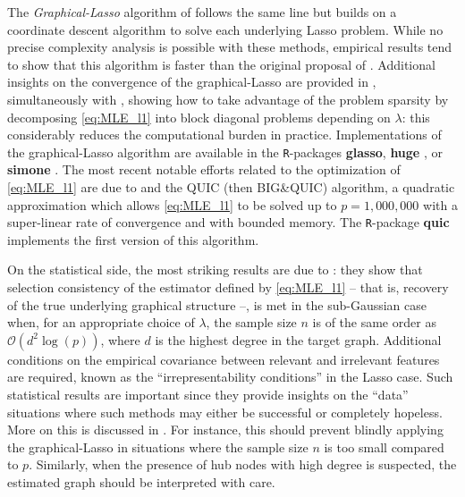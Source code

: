 The   \emph{Graphical-Lasso}   algorithm  of   \cite{2007_BS_Friedman}
follows the same line but builds  on a coordinate descent algorithm to
solve  each underlying  Lasso  problem.  While  no precise  complexity
analysis is  possible with  these methods,  empirical results  tend to
show  that this  algorithm is  faster  than the  original proposal  of
\cite{2008_JMLR_Banerjee}.  Additional insights  on the convergence of
the  graphical-Lasso  are  provided  in  \cite{mazumder2012graphical},
simultaneously   with  \cite{witten2011new},   showing  how   to  take
advantage  of the  problem sparsity  by decomposing  \eqref{eq:MLE_l1}
into block diagonal problems depending on $\lambda$: this considerably
reduces the computational burden  in practice.  Implementations of the
graphical-Lasso  algorithm are  available  in the  \texttt{R}-packages
\textbf{glasso},     \textbf{huge}    \citep{2014_huge_package},     or
\textbf{simone} \citep{2009_BI_Chiquet}. The most recent notable
efforts related  to the optimization  of \eqref{eq:MLE_l1} are  due to
\cite{hsieh2014quic,NIPS2013_4923}  and  the   QUIC  (then  BIG\&QUIC)
algorithm, a quadratic approximation which allows \eqref{eq:MLE_l1} to
be solved up to $p=1,000,000$  with a super-linear rate of convergence
and  with   bounded  memory.   The   \texttt{R}-package  \textbf{quic}
implements the first version of this algorithm.

On  the  statistical  side,  the  most striking  results  are  due  to
\cite{2011_EJS_Ravikumar}: they show that selection consistency of the
estimator defined  by \eqref{eq:MLE_l1}  -- that  is, recovery  of the
true underlying  graphical structure  --, is  met in  the sub-Gaussian
case when, for an appropriate choice of $\lambda$, the sample size $n$
is of the  same order as $\mathcal{O}(d^2 \log(p))$, where  $d$ is the
highest  degree in  the target  graph.  Additional  conditions on  the
empirical  covariance between  relevant  and  irrelevant features  are
required, known as the  ``irrepresentability conditions'' in the Lasso
case.   Such  statistical results  are  important  since they  provide
insights on the  ``data'' situations where such methods  may either be
successful  or completely  hopeless.   More on  this  is discussed  in
\cite{2012_EJS_Verzelen}.  For  instance, this should  prevent blindly
applying the graphical-Lasso  in situations where the  sample size $n$
is too  small compared to  $p$.  Similarly,  when the presence  of hub
nodes with  high degree  is suspected, the  estimated graph  should be
interpreted with care.


